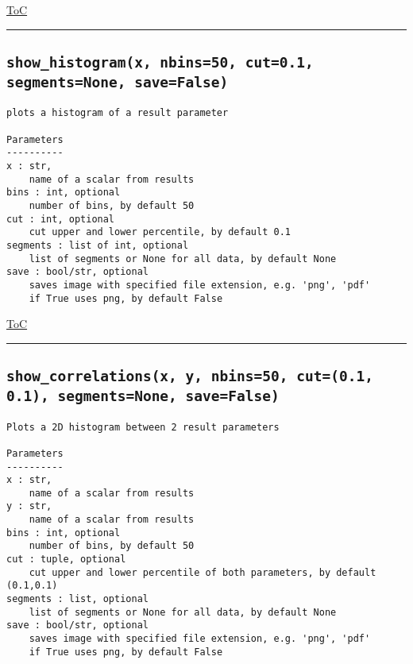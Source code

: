 \documentclass{article}
\begin{document}
\begin{flushright}

\hyperref[toc]{ToC}

\end{flushright}



\vspace{5mm}

\hrule

\subsection*{\texttt{show\_histogram(x, nbins=50, cut=0.1, segments=None, save=False)}}
\label{fun:showhistogram}

\begin{lstlisting}[language=docstring]
plots a histogram of a result parameter

Parameters
----------
x : str,
    name of a scalar from results
bins : int, optional
    number of bins, by default 50
cut : int, optional
    cut upper and lower percentile, by default 0.1
segments : list of int, optional
    list of segments or None for all data, by default None
save : bool/str, optional
    saves image with specified file extension, e.g. 'png', 'pdf'
    if True uses png, by default False
\end{lstlisting}

\begin{flushright}

\hyperref[toc]{ToC}

\end{flushright}



\vspace{5mm}

\hrule

\subsection*{\texttt{show\_correlations(x, y, nbins=50, cut=(0.1, 0.1), segments=None, save=False)}}
\label{fun:showcorrelations}

\begin{lstlisting}[language=docstring]
Plots a 2D histogram between 2 result parameters

Parameters
----------
x : str,
    name of a scalar from results
y : str,
    name of a scalar from results
bins : int, optional
    number of bins, by default 50
cut : tuple, optional
    cut upper and lower percentile of both parameters, by default (0.1,0.1)
segments : list, optional
    list of segments or None for all data, by default None
save : bool/str, optional
    saves image with specified file extension, e.g. 'png', 'pdf'
    if True uses png, by default False
\end{lstlisting}
\end{document}
